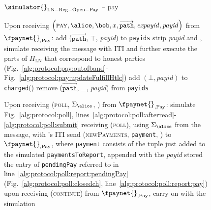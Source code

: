 \begin{figure}[!htbp]
\begin{simulatorbox}{$\simulator{}_{\mathrm{LN - Reg - Open - Pay}}$ -- pay}
\begin{algorithmic}[1]
      \State Upon receiving $\left(\textsc{pay}, \alice, \bob, x,
      \overrightarrow{\mathtt{path}}, \mathit{expayid},
      \mathit{payid}\right)$ from $\fpaynet{}_{\mathrm{, Pay}}$:
      \Indent
        \State add ($\overrightarrow{\mathtt{path}}$, $\top$,
        \textit{payid}) to \texttt{payids}
        \State strip \textit{payid} and \alice, simulate receiving the
        message with \alice{} ITI and further execute the parts of
        $\Pi_{\mathrm{LN}}$ that correspond to honest parties
        (Fig.~\ref{alg:protocol:pay:outofband}-Fig.~\ref{alg:protocol:pay:updateFulfillHtlc})
        \label{alg:sim:pay:simulate}
         
          \State add $\left(\bot, \mathit{payid}\right)$ to
          \texttt{charged}(\alice)
          \label{alg:sim:pay:failed}
          \State remove ($\overrightarrow{\mathtt{path}}$, \_,
          \textit{payid}) from \texttt{payids}
        \EndIf
      \EndIndent
      \Statex

      \State Upon receiving (\textsc{poll}, $\Sigma_{\alice}$, \alice) from
      $\fpaynet{}_{\mathrm{, Pay}}$:
      \Indent
        \State simulate Fig.~\ref{alg:protocol:poll},
        lines~\ref{alg:protocol:poll:afterread}-\ref{alg:protocol:poll:submit}
        receiving (\textsc{poll}), using $\Sigma_{\alice}$ from the message,
        with \alice's ITI
        \label{alg:sim:poll:run}
        \label{alg:sim:poll:report:if}
          \State send (\textsc{newPayments}, \texttt{payment}, \alice) to
          $\fpaynet{}_{\mathrm{, Pay}}$, where \texttt{payment} consists of the
          tuple just added to the simulated \texttt{paymentsToReport}, appended
          with the \textit{payid} stored the entry of \texttt{pendingPay}
          referred to in line~\ref{alg:protocol:poll:report:pendingPay}
          (Fig.~\ref{alg:protocol:poll:closedch},
          line~\ref{alg:protocol:poll:report:pay})
          \label{alg:sim:poll:report}
          \State upon receiving (\textsc{continue}) from $\fpaynet{}_{\mathrm{,
          Pay}}$, carry on with the simulation
        \EndIf
      \EndIndent
    \end{algorithmic}
  \end{simulatorbox}
  \caption{}
  \label{alg:sim:pay}
\end{figure}


